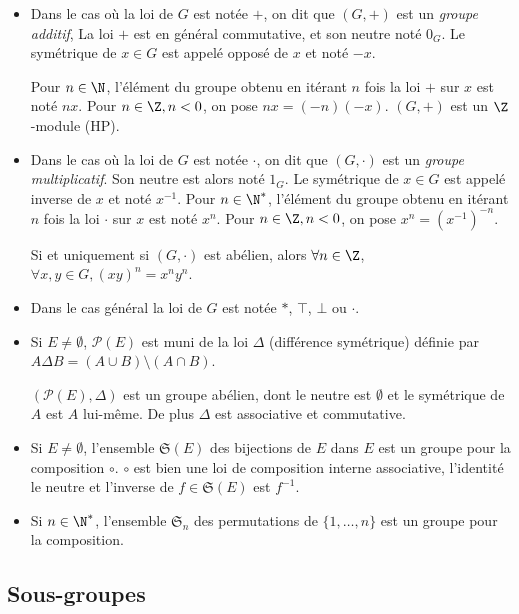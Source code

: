 \begin{itemize}
    \item Dans le cas où la loi de $G$ est notée $+$, on dit que $(G, +)$ est un \emph{groupe additif},
    La loi $+$ est en général commutative, et son neutre noté $0_G$. Le symétrique de $x \in G$ 
    est appelé opposé de $x$ et noté $-x$.

    Pour $n \in \N$, l'élément du groupe obtenu en itérant $n$ fois la loi $+$ sur $x$ est noté
    $nx$. Pour $n \in \Z, n < 0$, on pose $nx = (-n)(-x)$. $(G, +)$ est un $\Z$-module (HP).
    \item Dans le cas où la loi de $G$ est notée $\cdot$, on dit que $(G, \cdot)$ est un \emph{groupe multiplicatif}.
    Son neutre est alors noté $1_G$. Le symétrique de $x \in G$ est appelé inverse de $x$ et noté $x^{-1}$.
    Pour $n \in \N^*$, l'élément du groupe obtenu en itérant $n$ fois la loi $\cdot$ sur $x$ est noté $x^n$. 
    Pour $n \in \Z, n < 0$, on pose $x^n = (x^{-1})^{-n}$.
    
    Si et uniquement si $(G, \cdot)$ est abélien, alors $\forall n \in \Z$, $\forall x, y \in G, (xy)^n = x^n y^n$.
    \item Dans le cas général la loi de $G$ est notée $\ast$, $\top$, $\bot$ ou $\cdot$. 

    \item Si $E \neq \emptyset$, $\mathscr P(E)$ est muni de la loi $\Delta$ (différence 
    symétrique) définie par $A \Delta B = (A \cup B) \setminus (A \cap B)$. 
    
    $(\mathscr P(E), \Delta)$ est un groupe abélien, dont le neutre est $\emptyset$ et
    le symétrique de $A$ est $A$ lui-même. De plus $\Delta$ est associative et commutative.

    \item Si $E \neq \emptyset$, l'ensemble $\mathfrak{S}(E)$ des bijections de $E$ dans $E$ est un groupe pour la composition $\circ$. 
    $\circ$ est bien une loi de composition interne associative, l'identité le neutre et l'inverse de $f \in \mathfrak{S}(E)$ est $f^{-1}$.

    \item Si $n \in \N^*$, l'ensemble $\mathfrak{S}_n$ des permutations de $\{1, \ldots, n\}$ est un groupe pour la composition.
\end{itemize}

\subsection{Sous-groupes}

